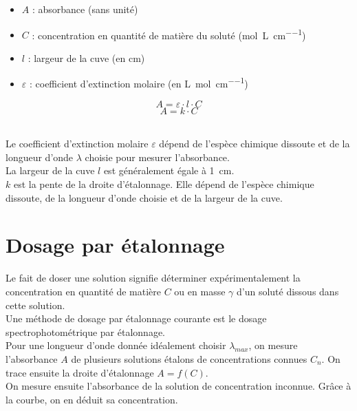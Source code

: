 \documentclass[a4paper,11pt,fleqn]{scrartcl}%
\begin{document}
\begin{minipage}
	{.69\linewidth}
	\begin{itemize}
		\item $A$ : absorbance (sans unité)
		\item $C$ : concentration en quantité de matière du soluté (\unit{\mole\per\liter\per\centi\meter})
		\item $l$ : largeur de la cuve (en cm)
		\item $\varepsilon$ : coefficient d'extinction molaire (en \unit{\liter\per\mole\per\centi\meter})
	\end{itemize}
\end{minipage}
\begin{minipage}
	{.29\linewidth}
	$$A = \varepsilon \cdot l \cdot C$$
	$$ A = k \cdot C$$
\end{minipage}\\

Le coefficient d'extinction molaire $\varepsilon$ dépend de l'espèce chimique dissoute et de la longueur d'onde $\lambda$ choisie pour mesurer l'absorbance.\\

La largeur de la cuve $l$ est généralement égale à \SI{1}{cm}.\\

$k$ est la pente de la droite d'étalonnage. Elle dépend de l'espèce chimique dissoute, de la longueur d'onde choisie et de la largeur de la cuve.

\section{Dosage par étalonnage}
Le fait de doser une solution signifie déterminer expérimentalement la concentration en quantité de matière $C$ ou en masse $\gamma$ d'un soluté dissous dans cette solution.\\
Une méthode de dosage par étalonnage courante est le dosage spectrophotométrique par étalonnage.\\
Pour une longueur d'onde donnée idéalement choisir $\lambda_{max}$, on mesure l'absorbance $A$ de plusieurs solutions étalons de concentrations connues $C_n$. On trace ensuite la droite d'étalonnage $A = f(C)$.\\
On mesure ensuite l'absorbance de la solution de concentration inconnue. Grâce à la courbe, on en déduit sa concentration.
\end{document}
